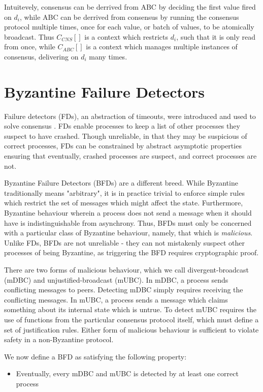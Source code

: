 Intuitevely, consensus can be derrived from ABC by deciding the first value fired on $d_i$,
while ABC can be derrived from consensus by running the consensus protocol multiple times,
once for each value, or batch of values, to be atomically broadcast.
Thus $ C_{CNS}[ ] $ is a context which restricts $d_i$, such that it is only read from once,
while $ C_{ABC}[ ] $ is a context which manages multiple instances of consensus, delivering on $d_i$ many times.


\section{Byzantine Failure Detectors}
Failure detectors (FDs), an abstraction of timeouts,
were introduced and used to solve consensus \cite{chandra1996unreliable}.
FDs enable processes to keep a list of other processes they suspect to have crashed.
Though unreliable, in that they may be suspicious of correct processes,
FDs can be constrained by abstract asymptotic properties ensuring that 
eventually, crashed processes are suspect, and correct processes are not.

Byzantine Failure Detectors (BFDs) are a different breed.
While Byzantine traditionally means "arbitrary", 
it is in practice trivial to enforce simple rules which restrict
the set of messages which might affect the state.
Furthermore, Byzantine behaviour wherein a process does not send a message when it should have 
is indistinguishable from asynchrony.
Thus, BFDs must only be concerned with a particular class of Byzantine behaviour,
namely, that which is \emph{malicious}.
Unlike FDs, BFDs are not unreliable - they can not mistakenly suspect other processes
of being Byzantine, as triggering the BFD requires cryptographic proof.

There are two forms of malicious behaviour, which we call divergent-broadcast (mDBC)
and unjustified-broadcast (mUBC). In mDBC, a process sends conflicting messages to peers.
Detecting mDBC simply requires receiving the conflicting messages.
In mUBC, a process sends a message which claims something about its internal state which is untrue.
To detect mUBC requires the use of functions from the particular consensus protocol itself,
which must define a set of justification rules.
Either form of malicious behaviour is sufficient to violate safety in a non-Byzantine protocol.

We now define a BFD as satisfying the following property:

\begin{itemize}
\item{Eventually, every mDBC and mUBC is detected by at least one correct process}
\end{itemize}

